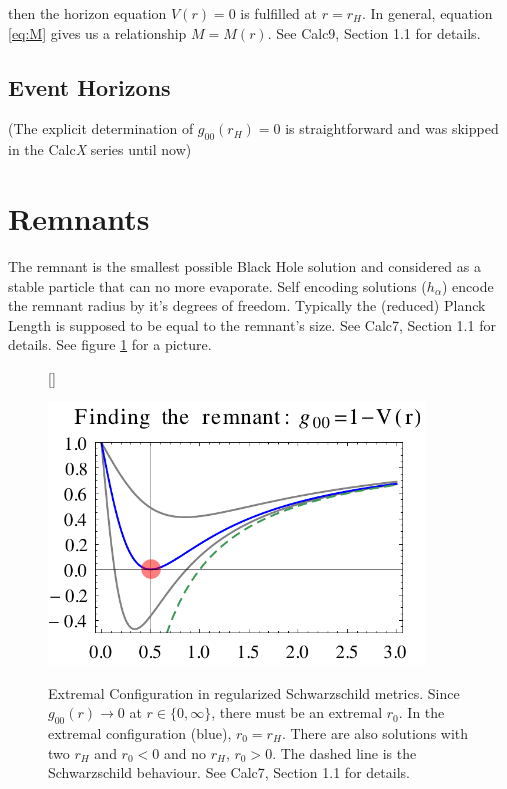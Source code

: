 \documentclass[10pt,a4paper, fleqn]{article}
\begin{document}
then the horizon equation $V(r)=0$ is fulfilled at $r=r_H$. In general, equation \ref{eq:M} gives us a relationship $M=M(r)$. See Calc9, Section 1.1 for details.

\subsection{Event Horizons}
(The explicit determination of $g_00(r_H) = 0$ is straightforward and was skipped in the Calc{\it X} series until now)

\newpage
\section{Remnants}
The remnant is the smallest possible Black Hole solution and considered as a stable particle that can no more evaporate. Self encoding solutions ($h_\alpha$) encode the remnant radius by it's degrees of freedom. Typically the (reduced) Planck Length is supposed to be equal to the remnant's size. See Calc7, Section 1.1 for details. See figure \ref{fig:extremal} for a picture.

\begin{figure}[h]
[\FBwidth]
{\caption{Extremal Configuration in regularized Schwarzschild metrics. Since $g_{00}(r) \to 0$ at $r\in\{0,\infty\}$, there must be an extremal $r_0$. In the extremal configuration (blue), $r_0 = r_H$. There are also solutions with two $r_H$ and $r_0<0$ and no $r_H$, $r_0>0$. The dashed line is the Schwarzschild behaviour. See Calc7, Section 1.1 for details.}\label{fig:extremal}}
{\includegraphics[width=10cm]{../Master-Calc7/mathematica/remnant-plot.pdf}}
\end{figure}
\end{document}
